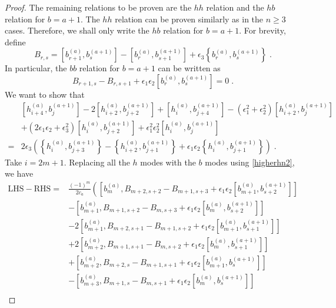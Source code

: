 \documentclass[11pt]{article}
\numberwithin{equation}{section}
\numberwithin{figure}{section}
\numberwithin{table}{section}
\begin{document}
\begin{proof}
	The remaining relations to be proven are the $hh$ relation and the $hb$ relation for $b=a+1$. The $hh$ relation can be proven similarly as in the $n\geq3$ cases. Therefore, we shall only write the $hb$ relation for $b=a+1$. For brevity, define
	\begin{equation}
		B_{r,s}=\left[b^{(a)}_{r+1},b^{(a+1)}_s\right]-\left[b^{(a)}_r,b^{(a+1)}_{s+1}\right]+\epsilon_3\left\{b^{(a)}_r,b^{(a+1)}_s\right\}\;.
	\end{equation}
	In particular, the $bb$ relation for $b=a+1$ can be written as
	\begin{equation}
		B_{r+1,s}-B_{r,s+1}+\epsilon_1\epsilon_2\left[b^{(a)}_r,b^{(a+1)}_s\right]=0\;.\label{Bidentity}
	\end{equation}
	We want to show that
	\begin{align}
		&\left[h^{(a)}_{i+4},b^{(a+1)}_j\right]-2\left[h^{(a)}_{i+2},b^{(a+1)}_{j+2}\right]+\left[h^{(a)}_i,b^{(a+1)}_{j+4}\right]-\left(\epsilon_1^2+\epsilon_2^2\right)\left[h^{(a)}_{i+2},b^{(a+1)}_j\right]\nonumber\\
		&+\left(2\epsilon_1\epsilon_2+\epsilon_3^2\right)\left[h^{(a)}_i,b^{(a+1)}_{j+2}\right]+\epsilon_1^2\epsilon_2^2\left[h^{(a)}_i,b^{(a+1)}_j\right]\nonumber\\
		=&2\epsilon_3\left(\left\{h^{(a)}_i,b^{(a+1)}_{j+3}\right\}-\left\{h^{(a)}_{i+2},b^{(a+1)}_{j+1}\right\}+\epsilon_1\epsilon_2\left\{h^{(a)}_i,b^{(a+1)}_{j+1}\right\}\right)\;.
	\end{align}
	Take $i=2m+1$. Replacing all the $h$ modes with the $b$ modes using \eqref{higherhn2}, we have
	\begin{align}
		\text{LHS}-\text{RHS}=&\frac{(-1)^m}{2c_a}\left(\left[b^{(a)}_{m},B_{m+2,s+2}-B_{m+1,s+3}+\epsilon_1\epsilon_2\left[b^{(a)}_{m+1},b^{(a+1)}_{s+2}\right]\right]\right.\nonumber\\
		&-\left[b^{(a)}_{m+1},B_{m+1,s+2}-B_{m,s+3}+\epsilon_1\epsilon_2\left[b^{(a)}_m,b^{(a+1)}_{s+2}\right]\right]\nonumber\\
		&-2\left[b^{(a)}_{m+1},B_{m+2,s+1}-B_{m+1,s+2}+\epsilon_1\epsilon_2\left[b^{(a)}_{m+1},b^{(a+1)}_{s+1}\right]\right]\nonumber\\
		&+2\left[b^{(a)}_{m+2},B_{m+1,s+1}-B_{m,s+2}+\epsilon_1\epsilon_2\left[b^{(a)}_m,b^{(a+1)}_{s+1}\right]\right]\nonumber\\
		&+\left[b^{(a)}_{m+2},B_{m+2,s}-B_{m+1,s+1}+\epsilon_1\epsilon_2\left[b^{(a)}_{m+1},b^{(a+1)}_s\right]\right]\nonumber\\
		&-\left[b^{(a)}_{m+3},B_{m+1,s}-B_{m,s+1}+\epsilon_1\epsilon_2\left[b^{(a)}_m,b^{(a+1)}_s\right]\right]\nonumber\\

\end{align}
\end{proof}
\end{document}

